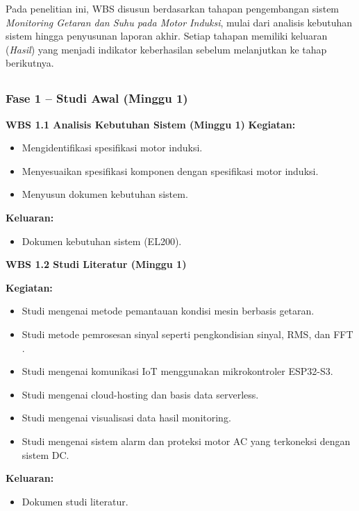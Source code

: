 \documentclass{elsinta}
\begin{document}
Pada penelitian ini, WBS disusun berdasarkan tahapan pengembangan sistem \textit{Monitoring Getaran dan Suhu pada Motor Induksi}, mulai dari analisis kebutuhan sistem hingga penyusunan laporan akhir. Setiap tahapan memiliki keluaran (\textit{Hasil}) yang menjadi indikator keberhasilan sebelum melanjutkan ke tahap berikutnya.

\subsection{\WBSTitle}

\subsubsection*{Fase 1 -- Studi Awal (Minggu 1)}
\textbf{WBS 1.1 Analisis Kebutuhan Sistem (Minggu 1)} 
\textbf{Kegiatan:}
\begin{itemize}
    \item Mengidentifikasi spesifikasi motor induksi.
    \item Menyesuaikan spesifikasi komponen dengan spesifikasi motor induksi.
    \item Menyusun dokumen kebutuhan sistem.
\end{itemize}

\textbf{Keluaran:}
\begin{itemize}
    \item Dokumen kebutuhan sistem (EL200).
\end{itemize}

\textbf{WBS 1.2 Studi Literatur (Minggu 1)}

\textbf{Kegiatan:}
\begin{itemize}
    \item Studi mengenai metode pemantauan kondisi mesin berbasis getaran.
    \item Studi metode pemrosesan sinyal seperti pengkondisian sinyal, RMS, dan FFT \cite{Oppenheim2021, Filho2025}.
    \item Studi mengenai komunikasi IoT menggunakan mikrokontroler ESP32-S3.
    \item Studi mengenai cloud-hosting dan basis data serverless.
    \item Studi mengenai visualisasi data hasil monitoring.
    \item Studi mengenai sistem alarm dan proteksi motor AC yang terkoneksi dengan sistem DC.
\end{itemize}

\textbf{Keluaran:}
\begin{itemize}
    \item Dokumen studi literatur.
\end{itemize}
\end{document}

